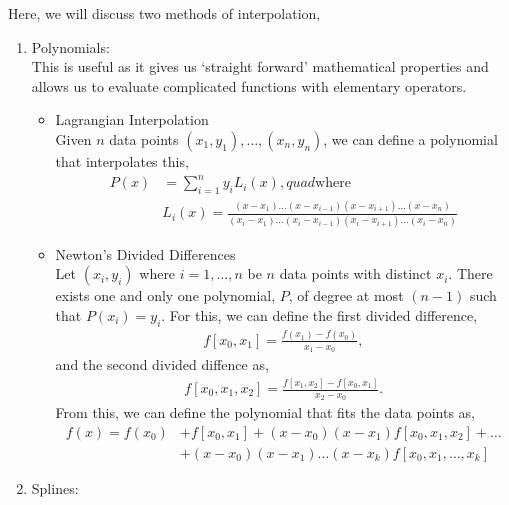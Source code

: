 \documentclass[11pt,a4paper]{report}
\begin{document}
			Here, we will discuss two methods of interpolation,
			\begin{enumerate}
				\item Polynomials: \\
					This is useful as it gives us `straight forward' mathematical properties and allows us to evaluate complicated functions with elementary operators.
					\begin{itemize}
						\item Lagrangian Interpolation \\
						Given $n$ data points $(x_1,y_1),\dots,(x_n,y_n)$, we can define a polynomial that interpolates this,
						\begin{align}
							P(x) &= \sum_{i=1}^n y_i L_i(x), quad \text{where} \\
							&L_i(x) = \frac{(x-x_1)\dots(x-x_{i-1})(x-x_{i+1})\dots (x-x_n)}{(x_i-x_1)\dots(x_i-x_{i-1})(x_i-x_{i+1})\dots (x_i-x_n)} \nonumber
						\end{align}
						\item Newton's Divided Differences \\
						Let $(x_i,y_i)$ where $i=1,\dots,n$ be $n$ data points with distinct $x_i$. There exists one and only one polynomial, $P$, of degree at most $(n-1)$ such that $P(x_i)=y_i$. For this, we can define the first divided difference,
						\begin{align}
							f[x_0,x_1] = \frac{f(x_1) - f(x_0)}{x_1-x_0},
						\end{align}
						and the second divided diffence as,
						\begin{align}
							f[x_0, x_1,x_2] = \frac{f[x_1,x_2]-f[x_0,x_1]}{x_2-x_0}.
						\end{align}
						From this, we can define the polynomial that fits the data points as,
						\begin{align}
							f(x) = f(x_0) &+ f[x_0,x_1] + (x-x_0)(x-x_1)f[x_0,x_1,x_2] + \dots \\ 
										  &+ (x-x_0)(x-x_1)\dots(x-x_k) f[x_0,x_1,\dots,x_k]
						\end{align}
						
					\end{itemize}
				\item Splines:
			\end{enumerate}
\end{document}
